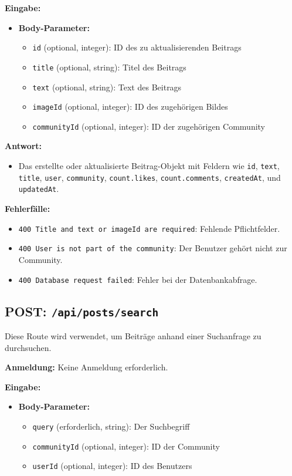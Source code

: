 \documentclass[a4paper,12pt]{article}
\begin{document}
\textbf{Eingabe:}
\begin{itemize}
    \item \textbf{Body-Parameter:}
    \begin{itemize}
        \item \texttt{id} (optional, integer): ID des zu aktualisierenden Beitrags
        \item \texttt{title} (optional, string): Titel des Beitrags
        \item \texttt{text} (optional, string): Text des Beitrags
        \item \texttt{imageId} (optional, integer): ID des zugehörigen Bildes
        \item \texttt{communityId} (optional, integer): ID der zugehörigen Community
    \end{itemize}
\end{itemize}

\textbf{Antwort:}
\begin{itemize}
    \item Das erstellte oder aktualisierte Beitrag-Objekt mit Feldern wie \texttt{id}, \texttt{text}, \texttt{title}, \texttt{user}, \texttt{community}, \texttt{count.likes}, \texttt{count.comments}, \texttt{createdAt}, und \texttt{updatedAt}.
\end{itemize}

\textbf{Fehlerfälle:}
\begin{itemize}
    \item \texttt{400 Title and text or imageId are required}: Fehlende Pflichtfelder.
    \item \texttt{400 User is not part of the community}: Der Benutzer gehört nicht zur Community.
    \item \texttt{400 Database request failed}: Fehler bei der Datenbankabfrage.
\end{itemize}

\newpage
\subsection{POST: \texttt{/api/posts/search}}

Diese Route wird verwendet, um Beiträge anhand einer Suchanfrage zu durchsuchen.

\textbf{Anmeldung:} Keine Anmeldung erforderlich.

\textbf{Eingabe:}
\begin{itemize}
    \item \textbf{Body-Parameter:}
    \begin{itemize}
        \item \texttt{query} (erforderlich, string): Der Suchbegriff
        \item \texttt{communityId} (optional, integer): ID der Community
        \item \texttt{userId} (optional, integer): ID des Benutzers
    \end{itemize}
\end{itemize}
\end{document}
